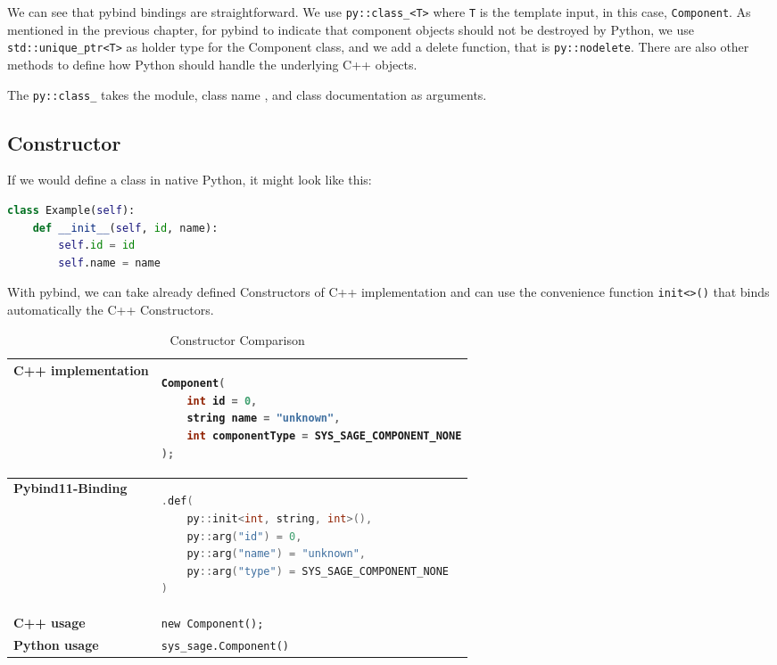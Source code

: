 We can see that pybind bindings are straightforward. We use \verb|py::class_<T>| where \verb|T| is the template input, in this case, \verb|Component|. As mentioned in the previous chapter, for pybind to indicate that component objects should not be destroyed by Python, we use \verb|std::unique_ptr<T>| as holder type for the Component class, and we add a delete function, that is \verb|py::nodelete|. There are also other methods to define how Python should handle the underlying C++ objects.

The \verb|py::class_| takes the module, class name , and class documentation as arguments.


\subsection{Constructor}

If we would define a class in native Python, it might look like this:

\begin{lstlisting}[language=Python, xleftmargin=4em, frame = single]
class Example(self):
    def __init__(self, id, name):
        self.id = id
        self.name = name
\end{lstlisting}

With pybind, we can take already defined Constructors of C++ implementation and can use the convenience function \verb|init<>()| that binds automatically the C++ Constructors.

\begin{table}[htbp]
\centering
\begin{tabular}{|l|l|}
\hline
\textbf{C++ implementation} &
\begin{lstlisting}[language=C++]
Component(
    int id = 0,
    string name = "unknown",
    int componentType = SYS_SAGE_COMPONENT_NONE
);
\end{lstlisting}
\\ \hline
\textbf{Pybind11-Binding} &
\begin{lstlisting}[language=C++]
.def(
    py::init<int, string, int>(),
    py::arg("id") = 0,
    py::arg("name") = "unknown",
    py::arg("type") = SYS_SAGE_COMPONENT_NONE
)
\end{lstlisting}
\\ \hline
\textbf{C++ usage} &
\verb|new Component();| \\ \hline
\textbf{Python usage} &
\verb|sys_sage.Component()| \\ \hline
\end{tabular}
\caption{Constructor Comparison}
\label{tab:constructor}
\end{table}

